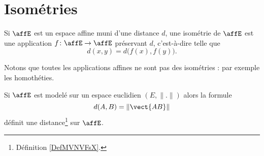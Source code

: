 \section{Isométries}

\begin{definition}       \label{DEFooZGKBooGgjkgs}
	Si \( \affE\) est un espace affine muni d'une distance \( d\), une isométrie de \( \affE\) est une application \( f\colon \affE\to \affE\) préservant \( d\), c'est-à-dire telle que
	\begin{equation}
		d( x,y )=d\big( f(x), f(y) \big).
	\end{equation}
\end{definition}
Notons que toutes les applications affines ne sont pas des isométries : par exemple les homothéties.

\begin{proposition}     \label{PROPooHSOGooBbFTYt}
	Si \( \affE\) est modelé sur un espace euclidien \( (E,\| . \|)\) alors la formule
	\begin{equation}
		d(A,B)=\| \vect{ AB } \|
	\end{equation}
	définit une distance\footnote{Définition \ref{DefMVNVFsX}.} sur \( \affE\).
\end{proposition}

